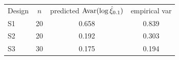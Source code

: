 \begin{tabular}{lccc}
\toprule
Design & $n$ & predicted $\mathrm{Avar}(\log\hat\xi_{0.1})$ & empirical var \\
S1 & 20 & 0.658 & 0.839 \\
S2 & 20 & 0.192 & 0.303 \\
S3 & 30 & 0.175 & 0.194 \\
\bottomrule
\end{tabular}
